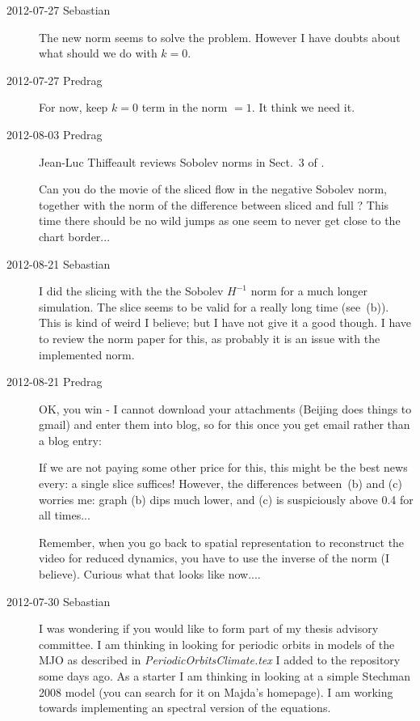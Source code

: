 \begin{description}
\item[2012-07-27 Sebastian]
The new norm seems to solve the problem. However I have doubts about what
should we do with $k=0$.

\item[2012-07-27 Predrag]
For now, keep $k=0$ term in the norm $=1$. It think we need it.

\item[2012-08-03 Predrag]
 {Jean-Luc
Thiffeault} reviews Sobolev norms in Sect.~3 of .

Can you do the movie of the sliced flow in the negative Sobolev norm,
together with the norm of the difference between sliced and full
\statesp? This time there should be no wild jumps as one seem to never
get close to the chart border...

\item[2012-08-21 Sebastian]
I did the slicing with the the Sobolev $H^{-1}$ norm   for
a much longer simulation. The slice seems to be valid for a really long
time (see \,(b)). This is kind of weird I believe;
but I have not give it a good though. I have to review the norm paper for
this, as probably it is an issue with the implemented norm.

\item[2012-08-21 Predrag]
OK, you win - I cannot download your attachments (Beijing does things to
gmail) and enter them into blog, so for this once you get email rather
than a blog entry:

If we are not paying some other price for this, this might be the best
news every: a single slice suffices! However, the differences between
\,(b) and (c) worries me: graph (b) dips much lower,
and (c) is suspiciously above 0.4 for all times...

Remember, when  you go back to spatial representation to reconstruct the
video for reduced dynamics, you have to use the inverse of the norm (I
believe). Curious what that looks like now....

\item[2012-07-30 Sebastian]
I was wondering if you would like to form part of my thesis advisory
committee. I am thinking in looking for periodic orbits in models of the
MJO as described in \emph{PeriodicOrbitsClimate.tex} I added to the repository some
days ago. As a starter I am thinking in looking at a simple
Stechman  2008 model (you can search for it on
Majda's 
{homepage}). I am working towards implementing an spectral version of the
equations.


\end{description}
